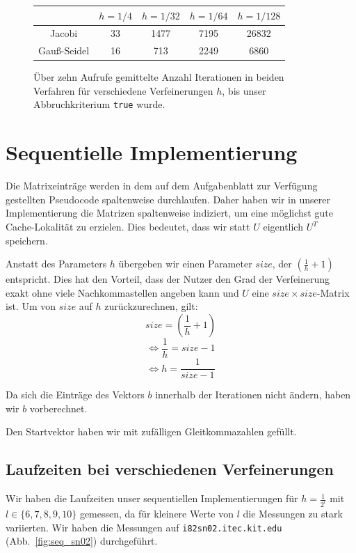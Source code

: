 \documentclass{article}
\begin{document}
\begin{figure}[htbp] 
  \centering

  \begin{tabular}{c|c|c|c|c}
     & $h=1/4$ & $h=1/32$ & $h=1/64$ & $h = 1/128$ \\ 
    \hline 
    Jacobi & 33 & 1477 & 7195 & 26832 \\ 
    \hline 
    Gauß-Seidel & 16 & 713 & 2249 & 6860 \\ 
    \end{tabular}   
  
  \caption{Über zehn Aufrufe gemittelte Anzahl Iterationen in beiden Verfahren für verschiedene Verfeinerungen $h$, bis unser Abbruchkriterium \texttt{true} wurde.}
  \label{fig:Bild1}
\end{figure}

\section{Sequentielle Implementierung}

Die Matrixeinträge werden in dem auf dem Aufgabenblatt zur Verfügung gestellten Pseudocode spaltenweise durchlaufen. Daher haben wir in unserer Implementierung die Matrizen spaltenweise indiziert, um eine möglichst gute Cache-Lokalität zu erzielen. Dies bedeutet, dass wir statt $U$ eigentlich $U^T$ speichern.

Anstatt des Parameters $h$ übergeben wir einen Parameter $size$, der $\left(\frac{1}{h}+1\right)$ entspricht. Dies hat den Vorteil, dass der Nutzer den Grad der Verfeinerung exakt ohne viele Nachkommastellen angeben kann und $U$ eine $size \times size$-Matrix ist.
Um von $size$ auf $h$ zurückzurechnen, gilt:
$$size = \left(\frac{1}{h} + 1\right)$$
$$\Leftrightarrow \frac{1}{h} = size - 1$$
$$\Leftrightarrow h = \frac{1}{size - 1}$$
 
Da sich die Einträge des Vektors $b$ innerhalb der Iterationen nicht ändern, haben wir $b$ vorberechnet.

Den Startvektor haben wir mit zufälligen Gleitkommazahlen gefüllt.

\subsection{Laufzeiten bei verschiedenen Verfeinerungen}
Wir haben die Laufzeiten unser sequentiellen Implementierungen für $h=\frac{1}{2^l}$ mit $l \in \{6, 7, 8, 9, 10\}$ gemessen, da für kleinere Werte von $l$ die Messungen zu stark variierten. Wir haben die Messungen auf \texttt{i82sn02.itec.kit.edu} (Abb.~\ref{fig:seq_sn02}) durchgeführt.
\end{document}
